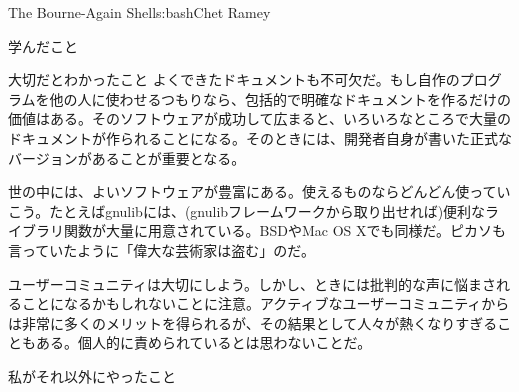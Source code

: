 \begin{aosachapter}{The Bourne-Again Shell}{s:bash}{Chet Ramey}
\begin{aosasect1}{学んだこと}
\begin{aosasect2}{大切だとわかったこと}
よくできたドキュメントも不可欠だ。もし自作のプログラムを他の人に使わせるつもりなら、包括的で明確なドキュメントを作るだけの価値はある。そのソフトウェアが成功して広まると、いろいろなところで大量のドキュメントが作られることになる。そのときには、開発者自身が書いた正式なバージョンがあることが重要となる。

世の中には、よいソフトウェアが豊富にある。使えるものならどんどん使っていこう。たとえばgnulibには、(gnulibフレームワークから取り出せれば)便利なライブラリ関数が大量に用意されている。BSDやMac OS Xでも同様だ。ピカソも言っていたように「偉大な芸術家は盗む」のだ。

ユーザーコミュニティは大切にしよう。しかし、ときには批判的な声に悩まされることになるかもしれないことに注意。アクティブなユーザーコミュニティからは非常に多くのメリットを得られるが、その結果として人々が熱くなりすぎることもある。個人的に責められているとは思わないことだ。

\end{aosasect2}

\begin{aosasect2}{私がそれ以外にやったこと}


\end{aosasect2}
\end{aosasect1}
\end{aosachapter}
